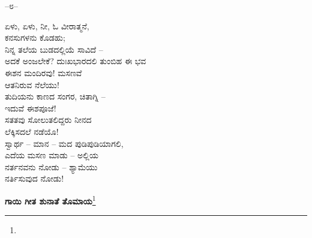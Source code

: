 \begin{center}
–೮–
\end{center}

ಏಳು, ಏಳು, ನೀ, ಓ ವೀರಾತ್ಮನೆ,\\ಕನಸುಗಳನು ಕೊಡಹು;\\ನಿನ್ನ ತಲೆಯ ಬುಡದಲ್ಲಿಯೆ ಸಾವಿದೆ –\\ಅದಕೆ ಅಂಜಲೇಕೆ? ದುಃಖಭಾರದಲಿ ತುಂಬಿಹ ಈ ಭವ\\ಈಶನ ಮಂದಿರವು! ಮಸಣವೆ\\ಆತನಿರುವ ನೆಲೆಯು!\\ತುದಿಯನು ಕಾಣದ ಸಂಗರ, ಚಿತಾಗ್ನಿ –\\ಇದುವೆ ಈಶಪೂಜೆ!\\ಸತತವು ಸೋಲುತಲಿದ್ದರು ನೀನದ\\ಲೆಕ್ಕಿಸದಲೆ ನಡೆಯೊ!\\ಸ್ವಾರ್ಥ – ಮಾನ – ಮದ ಪುಡಿಪುಡಿಯಾಗಲಿ,\\ಎದೆಯ ಮಸಣ ಮಾಡು – ಅಲ್ಲಿಯ\\ನರ್ತನವನು ನೋಡು – ಶ್ಯಾಮೆಯು\\ನರ್ತಿಸುವುದ ನೋಡು!

\begin{center}
\textbf{ಗಾಯಿ ಗೀತ ಶುನಾತೆ ತೊಮಾಯ}\footnote{}
\end{center}


